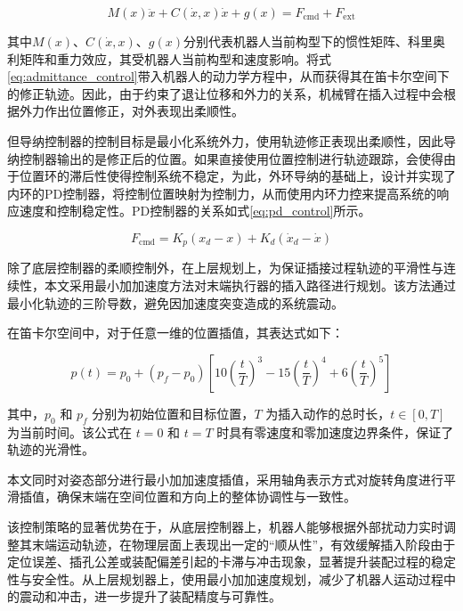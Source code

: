 \documentclass{Diploma}
\begin{document}
\begin{equation} \label{eq:admittance_control_dynamics}
M(x) \ddot{x} + C(\dot{x},x) \dot{x} + g (x) =F_{\text{cmd}} + F_{\text{ext}}
\end{equation}

其中$M(x)$、$C(\dot{x},x)$、$g (x)$分别代表机器人当前构型下的惯性矩阵、科里奥利矩阵和重力效应，其受机器人当前构型和速度影响。将式\eqref{eq:admittance_control}带入机器人的动力学方程中，从而获得其在笛卡尔空间下的修正轨迹。因此，由于约束了退让位移和外力的关系，机械臂在插入过程中会根据外力作出位置修正，对外表现出柔顺性\cite{ott2010unified}。

但导纳控制器的控制目标是最小化系统外力，使用轨迹修正表现出柔顺性，因此导纳控制器输出的是修正后的位置。如果直接使用位置控制进行轨迹跟踪，会使得由于位置环的滞后性使得控制系统不稳定，为此，外环导纳的基础上，设计并实现了内环的PD控制器，将控制位置映射为控制力，从而使用内环力控来提高系统的响应速度和控制稳定性。PD控制器的关系如式\eqref{eq:pd_control}所示。

\begin{equation} \label{eq:pd_control}
F_{\text{cmd}} = K_p (x_{d} - x) + K_d (\dot{x}_{d} - \dot{x})
\end{equation}

除了底层控制器的柔顺控制外，在上层规划上，为保证插接过程轨迹的平滑性与连续性，本文采用最小加加速度方法\cite{viviani1995minimum}对末端执行器的插入路径进行规划。该方法通过最小化轨迹的三阶导数，避免因加速度突变造成的系统震动。

在笛卡尔空间中，对于任意一维的位置插值，其表达式如下：

\begin{equation}
p(t) = p_0 + (p_f - p_0) \left[ 10\left( \frac{t}{T} \right)^3 - 15\left( \frac{t}{T} \right)^4 + 6\left( \frac{t}{T} \right)^5 \right]
\end{equation}

其中，$p_0$ 和 $p_f$ 分别为初始位置和目标位置，$T$ 为插入动作的总时长，$t \in [0, T]$ 为当前时间。该公式在 $t=0$ 和 $t=T$ 时具有零速度和零加速度边界条件，保证了轨迹的光滑性。

本文同时对姿态部分进行最小加加速度插值，采用轴角表示方式对旋转角度进行平滑插值，确保末端在空间位置和方向上的整体协调性与一致性。

该控制策略的显著优势在于，从底层控制器上，机器人能够根据外部扰动力实时调整其末端运动轨迹，在物理层面上表现出一定的“顺从性”，有效缓解插入阶段由于定位误差、插孔公差或装配偏差引起的卡滞与冲击现象，显著提升装配过程的稳定性与安全性。从上层规划器上，使用最小加加速度规划，减少了机器人运动过程中的震动和冲击，进一步提升了装配精度与可靠性。
\end{document}
